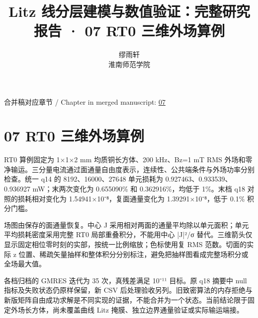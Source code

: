 \documentclass[11pt]{article}
\begin{document}
\title{Litz 线分层建模与数值验证：完整研究报告 · 07 RT0 三维外场算例}
\author{缪雨轩\\淮南师范学院}
\date{}
\maketitle
\noindent 合并稿对应章节 / Chapter in merged manuscript: \href{report_zh-CN_single.pdf#chapter-07}{07}\par
\FloatBarrier
\section*{07 RT0 三维外场算例}
\hypertarget{chapter-07}{}
RT0 算例固定为 1×1×2 mm 均质铜长方体、200 kHz、Bz=1 mT RMS 外场和零净输运。三分量电流通过面通量自由度表示，连续性、公共端条件与外场功率分别检查。统一 q14 的 8192、16000、27648 单元损耗为 0.927463、0.933539、0.936927 mW；末两次变化为 0.655090\% 和 0.362916\%，均低于 1\%。末档 q18 对照的损耗相对变化为 1.54941×10⁻⁸，复面通量变化为 1.39291×10⁻⁸，低于 0.1\% 积分门槛。


场图由保存的面通量恢复。中心 J 采用相对两面的通量平均除以单元面积；单元平均损耗密度采用完整 RT0 局部重叠积分，不能用中心 |J|²/σ 替代。三维箭头仅显示固定相位零时刻的实部，按统一比例缩放；色标使用复 RMS 范数。切面的实际 z 位置、稀疏矢量抽样和整体积分分别标注，避免把抽样图看成完整场积分或全场最大值。


各档归档的 GMRES 迭代为 35 次，真残差满足 10⁻¹¹ 目标。原 q18 摘要中 null 指标及失败状态仍原样保留，新 CSV 后处理验收另列。旧致密算法的内存拒绝与新版矩阵自由成功求解是不同实现的证据，不能合并为一个状态。当前结论限于固定外场长方体，尚未覆盖曲线 Litz 掩膜、独立边界通量验证或实际输运端接。
\end{document}
